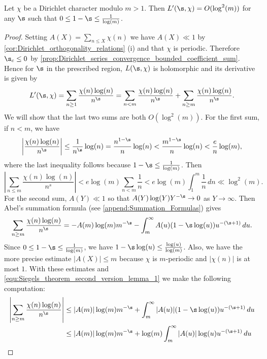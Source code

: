       \begin{lemma}\label{lem:Siegels_theorem_second_version_lemma}
        Let $\chi$ be a Dirichlet character modulo $m > 1$. Then $L'(\s,\chi) = O(\log^{2}(m))$ for any $\s$ such that $0 \le 1-\s \le \frac{1}{\log(m)}$.
      \end{lemma}
      \begin{proof}
        Setting $A(X) = \sum_{n \le X}\chi(n)$ we have $A(X) \ll 1$ by \cref{cor:Dirichlet_orthogonality_relations} (i) and that $\chi$ is periodic. Therefore $\s_{c} \le 0$ by \cref{prop:Dirichlet_series_convergence_bounded_coefficient_sum}. Hence for $\s$ in the prescribed region, $L(\s,\chi)$ is holomorphic and its derivative is given by
        \[
          L'(\s,\chi) = \sum_{n \ge 1}\frac{\chi(n)\log(n)}{n^{\s}} = \sum_{n < m}\frac{\chi(n)\log(n)}{n^{\s}}+\sum_{n \ge m}\frac{\chi(n)\log(n)}{n^{\s}}.
        \]
        We will show that the last two sums are both $O(\log^{2}(m))$. For the first sum, if $n < m$, we have
        \[
          \left|\frac{\chi(n)\log(n)}{n^{\s}}\right| \le \frac{1}{n^{\s}}\log(n) = \frac{n^{1-\s}}{n}\log(n) < \frac{m^{1-\s}}{n}\log(n) < \frac{e}{n}\log(m),
        \]
        where the last inequality follows because $1-\s \le \frac{1}{\log(m)}$. Then
        \[
          \left|\sum_{n \le m}\frac{\chi(n)\log(n)}{n^{s}}\right| < e\log(m)\sum_{n < m}\frac{1}{n} < e\log(m)\int_{1}^{m}\frac{1}{n}\,dn \ll \log^{2}(m).
        \]
        For the second sum, $A(Y) \ll 1$ so that $A(Y)\log(Y)Y^{-\s} \to 0$ as $Y \to \infty$. Then Abel's summation formula (see \cref{append:Summation_Formulas}) gives
        \begin{equation}\label{equ:Siegels_theorem_second_version_lemma_1}
          \sum_{n \ge m}\frac{\chi(n)\log(n)}{n^{\s}} = -A(m)\log(m)m^{-\s}-\int_{m}^{\infty}A(u)(1-\s\log(u))u^{-(\s+1)}\,du.
        \end{equation}
        Since $0 \le 1-\s \le \frac{1}{\log(m)}$, we have $1-\s\log(u) \le \frac{\log(u)}{\log(m)}$. Also, we have the more precise estimate $|A(X)| \le m$ because $\chi$ is $m$-periodic and $|\chi(n)|$ is at most $1$. With these estimates and \cref{equ:Siegels_theorem_second_version_lemma_1} we make the following computation:
        \begin{align*}
          \left|\sum_{n \ge m}\frac{\chi(n)\log(n)}{n^{\s}}\right| &\le |A(m)|\log(m)m^{-\s}+\int_{m}^{\infty}|A(u)|(1-\s\log(u))u^{-(\s+1)}\,du \\
          &\le |A(m)|\log(m)m^{-\s}+\log(m)\int_{m}^{\infty}|A(u)|\log(u)u^{-(\s+1)}\,du \\

\end{align*}
\end{proof}

